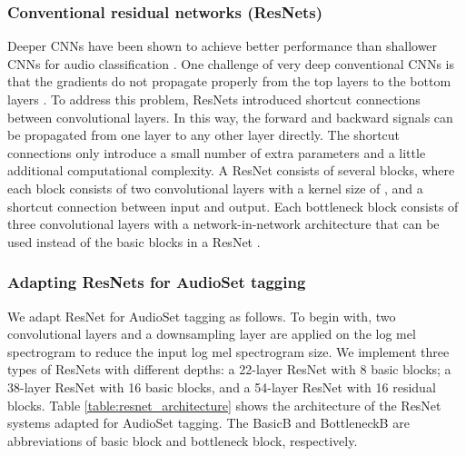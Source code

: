\documentclass[journal]{IEEEtran}
\begin{document}
\subsubsection{Conventional residual networks (ResNets)}
Deeper CNNs have been shown to achieve better performance than shallower CNNs for audio classification \cite{dai2017very}. One challenge of very deep conventional CNNs is that the gradients do not propagate properly from the top layers to the bottom layers \cite{he2016deep}. To address this problem, ResNets \cite{he2016deep} introduced shortcut connections between convolutional layers. In this way, the forward and backward signals can be propagated from one layer to any other layer directly. The shortcut connections only introduce a small number of extra parameters and a little additional computational complexity. A ResNet consists of several blocks, where each block consists of two convolutional layers with a kernel size of , and a shortcut connection between input and output. Each bottleneck block consists of three convolutional layers with a network-in-network architecture \cite{lin2013network} that can be used instead of the basic blocks in a ResNet \cite{he2016deep}.

\subsubsection{Adapting ResNets for AudioSet tagging}
We adapt ResNet \cite{he2016deep} for AudioSet tagging as follows. To begin with, two convolutional layers and a downsampling layer are applied on the log mel spectrogram to reduce the input log mel spectrogram size. We implement three types of ResNets with different depths: a 22-layer ResNet with 8 basic blocks; a 38-layer ResNet with 16 basic blocks, and a 54-layer ResNet with 16 residual blocks. Table \ref{table:resnet_architecture} shows the architecture of the ResNet systems adapted for AudioSet tagging. The BasicB and BottleneckB are abbreviations of basic block and bottleneck block, respectively. 
\end{document}
